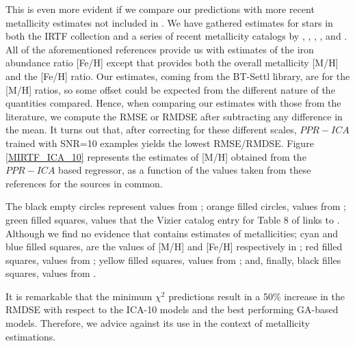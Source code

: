 This is even more evident if we compare our predictions with more
recent metallicity estimates not included in \cite{cesetti}. We have
gathered estimates for stars in both the IRTF collection and a series
of recent metallicity catalogs
by \cite{RA2012}, \cite{NevesIII}, \cite{Newton2014}, \cite{Gaidos2015},
and \cite{Mann2015}. All of the aforementioned references provide us
with estimates of the iron abundance ratio [Fe/H] except \cite{RA2012}
that provides both the overall metallicity [M/H] and the [Fe/H]
ratio. Our estimates, coming from the BT-Settl library, are for the
[M/H] ratios, so some offset could be expected from the different
nature of the quantities compared. Hence, when comparing our estimates
with those from the literature, we compute the RMSE or RMDSE after
subtracting any difference in the mean. It turns out that, after
correcting for these different scales, $PPR-ICA$ trained with SNR=10
examples yields the lowest RMSE/RMDSE. Figure \ref{MIRTF_ICA_10}
represents the estimates of [M/H] obtained from the $PPR-ICA$ based
regressor, as a function of the values taken from these references for
the sources in common. 

The black empty circles represent values
from \cite{cesetti} ; orange filled circles, values
from \cite{NevesIII}; green filled squares, values that the Vizier
catalog entry for Table 8 of
\cite{NevesIII} links to \cite{Jao}. Although we find no evidence
that \cite{Jao} contains estimates of metallicities; cyan and blue
filled squares, are the values of [M/H] and [Fe/H] respectively
in \cite{RA2012}; red filled squares, values from \cite{Mann2015};
yellow filled squares, values from \cite{Newton2014}; and, finally,
black filles squares, values from \cite{Gaidos2015}.

It is remarkable that the minimum $\chi^2$ predictions result in a
50\% increase in the RMDSE with respect to the ICA-10 models and the
best performing GA-based models. Therefore, we advice against its use
in the context of metallicity estimations. 

